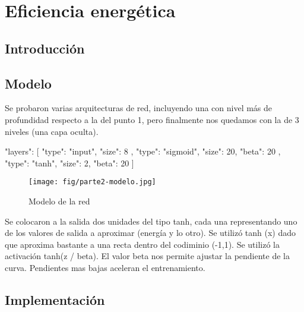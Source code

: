 \newpage
\section{Eficiencia energética}


\subsection{Introducción}


\subsection{Modelo}

Se probaron varias arquitecturas de red, incluyendo una con nivel más de profundidad respecto a la del punto 1, pero finalmente nos quedamos con la de 3 niveles (una capa oculta).

{
"layers": [{
"type": "input",
"size": 8
}, {
"type": "sigmoid",
"size": 20,
"beta": 20
}, {
"type": "tanh",
"size": 2,
"beta": 20
}]
}


\begin{figure}[ht!]
	\centering
	\texttt{[image: fig/parte2-modelo.jpg]}
	\caption{Modelo de la red}
\end{figure}

Se colocaron a la salida dos unidades del tipo tanh, cada una representando uno de los valores de salida a aproximar (energía y lo otro). Se utilizó tanh (x) 
dado que aproxima bastante a una recta dentro del codiminio (-1,1). Se utilizó la activación tanh(z / beta).  El valor beta nos permite ajustar la pendiente de la curva. 
Pendientes mas bajas aceleran el entrenamiento.




\subsection{Implementación}

